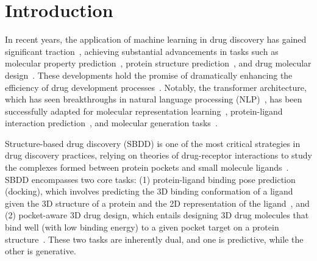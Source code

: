 \section{Introduction}
In recent years, the application of machine learning in drug discovery has gained significant traction~\citep{AIDDsurvey}, achieving substantial advancements in tasks such as molecular property prediction~\citep{PropPred,PropPred2,PropPredSurvey}, protein structure prediction~\citep{AlphaFold2,RoseTTAfold,ESMFold}, and drug molecular design~\citep{Reinvent,AR,ReinforcedGA,MolDesignSurvey,MolDesignSurvey2}. These developments hold the promise of dramatically enhancing the efficiency of drug development processes~\citep{AIDDsurvey2}. Notably, the transformer architecture, which has seen breakthroughs in natural language processing (NLP)~\citep{BERT,GPT-3}, has been successfully adapted for molecular representation learning~\citep{Uni-Mol,DrugClip}, protein-ligand interaction prediction~\citep{PLIntSurvey,AlphaFold3}, and molecular generation tasks~\citep{MolGPT,MolRL-MGPT}.

Structure-based drug discovery (SBDD) is one of the most critical strategies in drug discovery practices, relying on theories of drug-receptor interactions to study the complexes formed between protein pockets and small molecule ligands~\citep{SBDDsurvey}. SBDD encompasses two core tasks: (1) protein-ligand binding pose prediction (docking), which involves predicting the 3D binding conformation of a ligand given the 3D structure of a protein and the 2D representation of the ligand~\citep{DockingSurvey}, and (2) pocket-aware 3D drug design, which entails designing 3D drug molecules that bind well (with low binding energy) to a given pocket target on a protein structure~\citep{SBDDsurvey2,SBDDsurvey3}. These two tasks are inherently dual, and one is predictive, while the other is generative.

